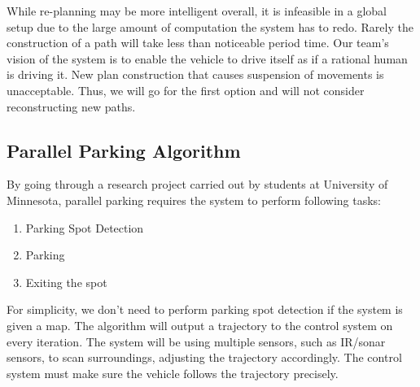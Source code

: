 \documentclass[compsoc,draftclsnofoot,onecolumn,10pt]{IEEEtran}
\begin{document}
While re-planning may be more intelligent overall, it is infeasible in a global 
setup due to the large amount of computation the system has to redo. Rarely the 
construction of a path will take less than noticeable period time. Our team’s 
vision of the system is to enable the vehicle to drive itself as if a rational 
human is driving it. New plan construction that causes suspension of movements is 
unacceptable. Thus, we will go for the first option and will not consider 
reconstructing new paths.\par

\subsection{Parallel Parking Algorithm}
By going through a research project carried out by students at University of 
Minnesota, parallel parking requires the system to perform following tasks:\par

\begin{enumerate}
\item Parking Spot Detection
\item Parking
\item Exiting the spot
\end{enumerate}

For simplicity, we don’t need to perform parking spot detection if the system 
is given a map. The algorithm will output a trajectory to the control system on 
every iteration. The system will be using multiple sensors, such as IR/sonar 
sensors, to scan surroundings, adjusting the trajectory accordingly. The control 
system must make sure the vehicle follows the trajectory precisely.\par
\end{document}
